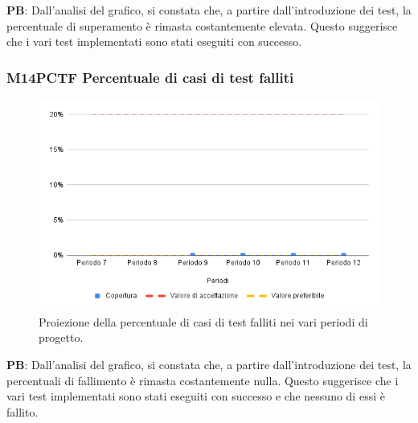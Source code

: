 \textbf{PB}: Dall’analisi del grafico, si constata che, a partire dall’introduzione dei test, la percentuale di superamento è rimasta costantemente elevata. Questo suggerisce che i vari test implementati sono stati eseguiti con successo.
\vspace{0.2cm}

\subsubsection{M14PCTF Percentuale di casi di test falliti}

\vspace{0.3cm}

\begin{figure}[H]
    \centering
    \includegraphics[width=1\textwidth]{../Images/PianoDiQualifica/M14PCTF.png}
    \caption{Proiezione della percentuale di casi di test falliti nei vari periodi di progetto.}
    \label{fig:16}
\end{figure}

\textbf{PB}: Dall’analisi del grafico, si constata che, a partire dall'introduzione dei test, la percentuali di fallimento è rimasta costantemente nulla. Questo suggerisce che i vari test implementati sono stati eseguiti con successo e che nessuno di essi è fallito.

\vspace{0.2cm}


